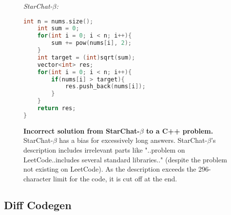 \begin{figure}[htbp]
\hrulefill

\emph{StarChat-$\beta$:}

\hrulefill

\begin{lstlisting}[language=C++,breaklines=true,basicstyle=\ttfamily\scriptsize]
    int n = nums.size();
    int sum = 0;
    for(int i = 0; i < n; i++){
        sum += pow(nums[i], 2);
    }
    int target = (int)sqrt(sum);
    vector<int> res;
    for(int i = 0; i < n; i++){
        if(nums[i] > target){
            res.push_back(nums[i]);
        }
    }
    return res;
}
\end{lstlisting}

\hrulefill
\caption{\textbf{Incorrect solution from StarChat-$\beta$ to a \evale{} C++ problem.} StarChat-$\beta$ has a bias for excessively long answers. StarChat-$\beta$'s description includes irrelevant parts like "..problem on LeetCode..includes several standard libraries.." (despite the problem not existing on LeetCode). As the description exceeds the 296-character limit for the code, it is cut off at the end.}
\label{fig:starchatbetacpp}
\end{figure}


\FloatBarrier



\subsection{Diff Codegen}
\label{sec:examplesdiffcodegen}

